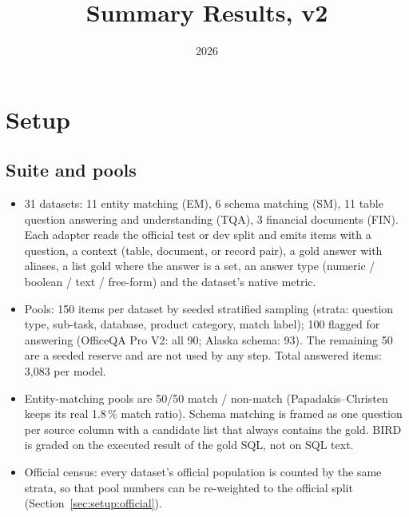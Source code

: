 \documentclass[11pt]{article}
\title{Summary Results, v2}
\author{}
\date{2026}
\begin{document}
\maketitle

\section{Setup}
\label{sec:setup}

\subsection{Suite and pools}
\begin{itemize}
\item 31 datasets: 11 entity matching (EM), 6 schema matching (SM), 11 table question answering and understanding (TQA), 3 financial documents (FIN). Each adapter reads the official test or dev split and emits items with a question, a context (table, document, or record pair), a gold answer with aliases, a list gold where the answer is a set, an answer type (numeric / boolean / text / free-form) and the dataset's native metric.
\item Pools: 150 items per dataset by seeded stratified sampling (strata: question type, sub-task, database, product category, match label); 100 flagged for answering (OfficeQA Pro V2: all 90; Alaska schema: 93). The remaining 50 are a seeded reserve and are not used by any step. Total answered items: 3,083 per model.
\item Entity-matching pools are 50/50 match / non-match (Papadakis--Christen keeps its real 1.8\,\% match ratio). Schema matching is framed as one question per source column with a candidate list that always contains the gold. BIRD is graded on the executed result of the gold SQL, not on SQL text.
\item Official census: every dataset's official population is counted by the same strata, so that pool numbers can be re-weighted to the official split (Section~\ref{sec:setup:official}).
\end{itemize}
\end{document}
